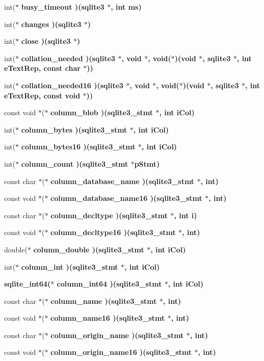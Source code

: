 \begin{CompactItemize}
int($\ast$ \bf{busy\_\-timeout} )(\bf{sqlite3} $\ast$, int ms)
\item 
int($\ast$ \bf{changes} )(\bf{sqlite3} $\ast$)
\item 
int($\ast$ \bf{close} )(\bf{sqlite3} $\ast$)
\item 
int($\ast$ \bf{collation\_\-needed} )(\bf{sqlite3} $\ast$, void $\ast$, void($\ast$)(void $\ast$, \bf{sqlite3} $\ast$, int e\-Text\-Rep, const char $\ast$))
\item 
int($\ast$ \bf{collation\_\-needed16} )(\bf{sqlite3} $\ast$, void $\ast$, void($\ast$)(void $\ast$, \bf{sqlite3} $\ast$, int e\-Text\-Rep, const void $\ast$))
\item 
const void $\ast$($\ast$ \bf{column\_\-blob} )(\bf{sqlite3\_\-stmt} $\ast$, int i\-Col)
\item 
int($\ast$ \bf{column\_\-bytes} )(\bf{sqlite3\_\-stmt} $\ast$, int i\-Col)
\item 
int($\ast$ \bf{column\_\-bytes16} )(\bf{sqlite3\_\-stmt} $\ast$, int i\-Col)
\item 
int($\ast$ \bf{column\_\-count} )(\bf{sqlite3\_\-stmt} $\ast$p\-Stmt)
\item 
const char $\ast$($\ast$ \bf{column\_\-database\_\-name} )(\bf{sqlite3\_\-stmt} $\ast$, int)
\item 
const void $\ast$($\ast$ \bf{column\_\-database\_\-name16} )(\bf{sqlite3\_\-stmt} $\ast$, int)
\item 
const char $\ast$($\ast$ \bf{column\_\-decltype} )(\bf{sqlite3\_\-stmt} $\ast$, int i)
\item 
const void $\ast$($\ast$ \bf{column\_\-decltype16} )(\bf{sqlite3\_\-stmt} $\ast$, int)
\item 
double($\ast$ \bf{column\_\-double} )(\bf{sqlite3\_\-stmt} $\ast$, int i\-Col)
\item 
int($\ast$ \bf{column\_\-int} )(\bf{sqlite3\_\-stmt} $\ast$, int i\-Col)
\item 
\bf{sqlite\_\-int64}($\ast$ \bf{column\_\-int64} )(\bf{sqlite3\_\-stmt} $\ast$, int i\-Col)
\item 
const char $\ast$($\ast$ \bf{column\_\-name} )(\bf{sqlite3\_\-stmt} $\ast$, int)
\item 
const void $\ast$($\ast$ \bf{column\_\-name16} )(\bf{sqlite3\_\-stmt} $\ast$, int)
\item 
const char $\ast$($\ast$ \bf{column\_\-origin\_\-name} )(\bf{sqlite3\_\-stmt} $\ast$, int)
\item 
const void $\ast$($\ast$ \bf{column\_\-origin\_\-name16} )(\bf{sqlite3\_\-stmt} $\ast$, int)

\end{CompactItemize}

